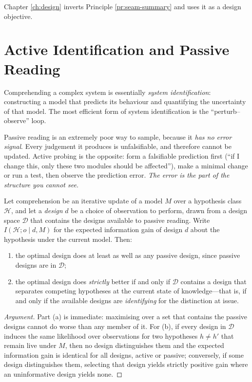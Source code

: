 Chapter \ref{ch:design} inverts Principle \ref{pr:seam-summary} and uses it as a design
objective.

\section{Active Identification and Passive Reading}\label{sec:active}

\begin{principle}\label{pr:sysid}
Comprehending a complex system is essentially \emph{system identification}: constructing a
model that predicts its behaviour and quantifying the uncertainty of that model. The most
efficient form of system identification is the ``perturb--observe'' loop.
\end{principle}

Passive reading is an extremely poor way to sample, because it \emph{has no error signal}.
Every judgement it produces is unfalsifiable, and therefore cannot be updated. Active probing
is the opposite: form a falsifiable prediction first (``if I change this, only these two
modules should be affected''), make a minimal change or run a test, then observe the
prediction error. \emph{The error is the part of the structure you cannot see.}

\begin{proposition}\label{prop:active}
Let comprehension be an iterative update of a model $M$ over a hypothesis class $\mathcal{H}$, and
let a \emph{design} $d$ be a choice of observation to perform, drawn from a design space
$\mathcal{D}$ that contains the designs available to passive reading. Write
$I(\mathcal{H}; o \mid d, M)$ for the expected information gain of design $d$ about the hypothesis
under the current model. Then:
\begin{enumerate}[label=(\alph*)]
\item the optimal design does at least as well as any passive design, since passive designs are in
      $\mathcal{D}$;
\item the optimal design does \emph{strictly} better if and only if $\mathcal{D}$ contains a design
      that separates competing hypotheses at the current state of knowledge---that is, if and only
      if the available designs are \emph{identifying} for the distinction at issue.
\end{enumerate}
\end{proposition}

\begin{proof}[Argument]
Part (a) is immediate: maximising over a set that contains the passive designs cannot do worse than
any member of it. For (b), if every design in $\mathcal{D}$ induces the same likelihood over
observations for two hypotheses $h \ne h'$ that remain live under $M$, then no design distinguishes
them and the expected information gain is identical for all designs, active or passive; conversely,
if some design distinguishes them, selecting that design yields strictly positive gain where an
uninformative design yields none.
\end{proof}

